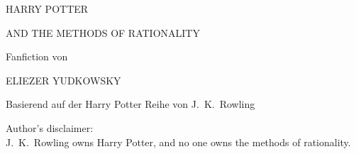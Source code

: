 \begin{center}
\thispagestyle{empty}
\vspace*{0.5cm}
%

\vspace*{-1.5cm}
{\hpfont
\Huge\MakeUppercase{Harry Potter}\vspace*{0.5cm}

\Large\MakeUppercase{and the Methods of Rationality} %
\vspace*{1\baselineskip}




\vspace*{7.0cm}

\Large Fanfiction von \vspace*{.10cm}

\huge \MakeUppercase{Eliezer Yudkowsky}%

\small

\vspace*{1\baselineskip}
Basierend auf der Harry Potter Reihe von J.~K.~Rowling\\
}
\vfill
{
\vspace*{1\baselineskip}
Author's disclaimer:\\J.~K.~Rowling owns Harry Potter, and no one owns the methods of rationality.

}
\end{center}
